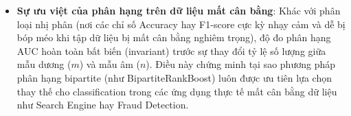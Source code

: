 \begin{itemize}
\begin{proof}[Chứng minh chi tiết Exercise 10.7]
    Chiều ngược không đúng. Ví dụ, giả sử mọi mẫu dương có score $s(x^+)=2$ và mọi mẫu âm có score $s(x^-)=1$. Ranking error bằng $0$ vì mọi mẫu dương đều đứng trên mọi mẫu âm. Nhưng nếu dùng ngưỡng phân loại $\theta=3$, tất cả các điểm đều bị gán nhãn âm, nên sai số phân loại cân bằng bằng $1/2$. Vì vậy ranking tốt không tự động suy ra classification tốt nếu chưa chọn được ngưỡng phân loại phù hợp.
    \end{proof}
\item \textbf{Sự ưu việt của phân hạng trên dữ liệu mất cân bằng}: Khác với phân loại nhị phân (nơi các chỉ số Accuracy hay F1-score cực kỳ nhạy cảm và dễ bị bóp méo khi tập dữ liệu bị mất cân bằng nghiêm trọng), độ đo phân hạng AUC hoàn toàn bất biến (invariant) trước sự thay đổi tỷ lệ số lượng giữa mẫu dương ($m$) và mẫu âm ($n$). Điều này chứng minh tại sao phương pháp phân hạng bipartite (như BipartiteRankBoost) luôn được ưu tiên lựa chọn thay thế cho classification trong các ứng dụng thực tế mất cân bằng dữ liệu như Search Engine hay Fraud Detection.
\end{itemize}
